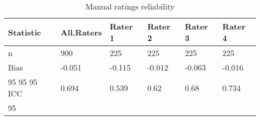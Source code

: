 \begin{table}[ht]
\centering
\begin{tabular}{llllll}
  \hline
Statistic & All.Raters & Rater 1 & Rater 2 & Rater 3 & Rater 4 \\ 
  \hline
n & 900 & 225 & 225 & 225 & 225 \\ 
  Bias & -0.051 & -0.115 & -0.012 & -0.063 & -0.016 \\ 
  95%
  95%
  95%
  ICC & 0.694 & 0.539 & 0.62 & 0.68 & 0.734 \\ 
  95%
   \hline
\end{tabular}
\caption{Manual ratings reliability} 
\label{tab:summary}
\end{table}
